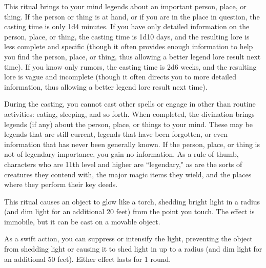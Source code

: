 \begin{spelleffect}
This ritual brings to your mind legends about an important person, place, or thing. If the person or thing is at hand, or if you are in the place in question, the casting time is only 1d4 minutes. If you have only detailed information on the person, place, or thing, the casting time is 1d10 days, and the resulting lore is less complete and specific (though it often provides enough information to help you find the person, place, or thing, thus allowing a better legend lore result next time). If you know only rumors, the casting time is 2d6 weeks, and the resulting lore is vague and incomplete (though it often directs you to more detailed information, thus allowing a better legend lore result next time).
\par During the casting, you cannot cast other spells or engage in other than routine activities: eating, sleeping, and so forth. When completed, the divination brings legends (if any) about the person, place, or things to your mind. These may be legends that are still current, legends that have been forgotten, or even information that has never been generally known. If the person, place, or thing is not of legendary importance, you gain no information. As a rule of thumb, characters who are 11th level and higher are ``legendary," as are the sorts of creatures they contend with, the major magic items they wield, and the places where they perform their key deeds.
\end{spelleffect}

\spellrng{\rngtouch}
\begin{spelleffect}
  This ritual causes an object to glow like a torch, shedding bright light in a \areamed radius (and dim light for an additional 20 feet) from the point you touch. The effect is immobile, but it can be cast on a movable object.
  
  As a swift action, you can suppress or intensify the light, preventing the object from shedding light or causing it to shed light in up to a \arealarge radius (and dim light for an additional 50 feet). Either effect lasts for 1 round.
\end{spelleffect}

